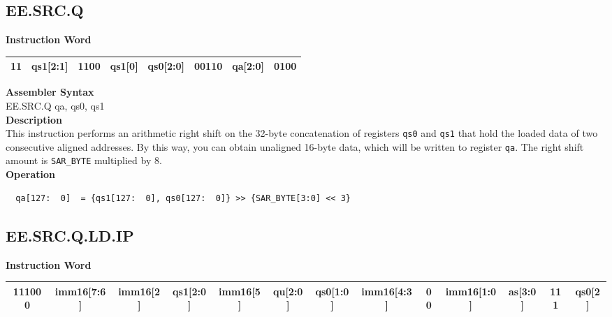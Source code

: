 \clearpage
\subsection{EE.SRC.Q}\label{instruction:EESRCQ}
\setlength\tabcolsep{6pt}
\textbf{Instruction Word} \\
\begin{tabular}{|c|c|c|c|c|c|c|c|}
	\hline
	11 & qs1[2:1] & 1100 & qs1[0] & qs0[2:0] & 00110 & qa[2:0] & 0100 \\
	\hline
\end{tabular}

\textbf{Assembler Syntax} \\
EE.SRC.Q qa, qs0, qs1 \\
\textbf{Description} \\
This instruction performs an arithmetic right shift on the 32-byte concatenation of registers \lstinline{qs0} and \lstinline{qs1} that hold the loaded data of two consecutive aligned addresses. By this way, you can obtain unaligned 16-byte data, which will be written to register \lstinline{qa}. The right shift amount is \lstinline{SAR_BYTE} multiplied by 8.\\
\textbf{Operation}
\begin{lstlisting}
  qa[127:  0]  = {qs1[127:  0], qs0[127:  0]} >> {SAR_BYTE[3:0] << 3}
\end{lstlisting}

\clearpage
\subsection{EE.SRC.Q.LD.IP}\label{instruction:EESRCQLDIP}
\setlength\tabcolsep{3.5pt}
\textbf{Instruction Word} \\
\begin{tabular}{|c|c|c|c|c|c|c|c|c|c|c|c|c|}
	\hline
	111000 & imm16[7:6] & imm16[2] & qs1[2:0] & imm16[5] & qu[2:0] & qs0[1:0] & imm16[4:3] & 00 & imm16[1:0] & as[3:0] & 111 & qs0[2] \\
	\hline
\end{tabular}

